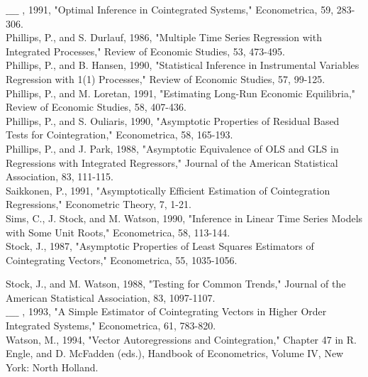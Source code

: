 \documentclass[10pt]{article}
\begin{document}
$\_\_\_\_$ , 1991, "Optimal Inference in Cointegrated Systems," Econometrica, 59, 283-306.\\
Phillips, P., and S. Durlauf, 1986, "Multiple Time Series Regression with Integrated Processes," Review of Economic Studies, 53, 473-495.\\
Phillips, P., and B. Hansen, 1990, "Statistical Inference in Instrumental Variables Regression with 1(1) Processes," Review of Economic Studies, 57, 99-125.\\
Phillips, P., and M. Loretan, 1991, "Estimating Long-Run Economic Equilibria," Review of Economic Studies, 58, 407-436.\\
Phillips, P., and S. Ouliaris, 1990, "Asymptotic Properties of Residual Based Tests for Cointegration," Econometrica, 58, 165-193.\\
Phillips, P., and J. Park, 1988, "Asymptotic Equivalence of OLS and GLS in Regressions with Integrated Regressors," Journal of the American Statistical Association, 83, 111-115.\\
Saikkonen, P., 1991, "Asymptotically Efficient Estimation of Cointegration Regressions," Econometric Theory, 7, 1-21.\\
Sims, C., J. Stock, and M. Watson, 1990, "Inference in Linear Time Series Models with Some Unit Roots," Econometrica, 58, 113-144.\\
Stock, J., 1987, "Asymptotic Properties of Least Squares Estimators of Cointegrating Vectors," Econometrica, 55, 1035-1056.

Stock, J., and M. Watson, 1988, "Testing for Common Trends," Journal of the American Statistical Association, 83, 1097-1107.\\
$\_\_\_\_$ , 1993, "A Simple Estimator of Cointegrating Vectors in Higher Order Integrated Systems," Econometrica, 61, 783-820.\\
Watson, M., 1994, "Vector Autoregressions and Cointegration," Chapter 47 in R. Engle, and D. McFadden (eds.), Handbook of Econometrics, Volume IV, New York: North Holland.
\end{document}

